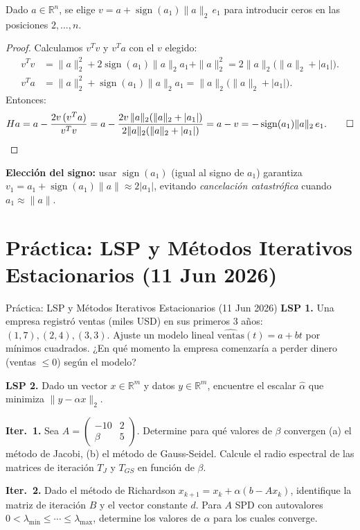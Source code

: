 \documentclass[11pt,a4paper]{article}
\begin{document}
Dado $a \in \mathbb{R}^n$, se elige
$v = a + \operatorname{sign}(a_1)\|a\|_2\,e_1$
para introducir ceros en las posiciones $2,\ldots,n$.

\begin{proof}
Calculamos $v^Tv$ y $v^Ta$ con el $v$ elegido:
\begin{align*}
  v^Tv &= \|a\|_2^2 + 2\operatorname{sign}(a_1)\|a\|_2 a_1 + \|a\|_2^2
         = 2\|a\|_2\bigl(\|a\|_2 + |a_1|\bigr).\\
  v^Ta &= \|a\|_2^2 + \operatorname{sign}(a_1)\|a\|_2 a_1
         = \|a\|_2\bigl(\|a\|_2 + |a_1|\bigr).
\end{align*}
Entonces:
\[
  Ha = a - \frac{2v\,(v^Ta)}{v^Tv}
  = a - \frac{2v\,\|a\|_2(\|a\|_2+|a_1|)}{2\|a\|_2(\|a\|_2+|a_1|)}
  = a - v = -\operatorname{sign}(a_1)\|a\|_2\,e_1. \qed
\]
\end{proof}

\begin{tcolorbox}[clave]
\textbf{Elección del signo:} usar $\operatorname{sign}(a_1)$ (igual al signo de $a_1$)
garantiza $v_1 = a_1 + \operatorname{sign}(a_1)\|a\|\approx 2|a_1|$,
evitando \textit{cancelación catastrófica} cuando $a_1 \approx \|a\|$.
\end{tcolorbox}

\section{Práctica: LSP y Métodos Iterativos Estacionarios (11 Jun 2026)}
\label{sec:practica_lsp_jacobi}

\begin{examen}{Práctica: LSP y Métodos Iterativos Estacionarios (11 Jun 2026)}
\textbf{LSP 1.} Una empresa registró ventas (miles USD) en sus primeros 3 años: $(1,7),(2,4),(3,3)$. Ajuste un modelo lineal $\widehat{\text{ventas}}(t)=a+bt$ por mínimos cuadrados. ¿En qué momento la empresa comenzaría a perder dinero (ventas $\le0$) según el modelo?

\smallskip\textbf{LSP 2.} Dado un vector $x\in\mathbb{R}^m$ y datos $y\in\mathbb{R}^m$, encuentre el escalar $\hat\alpha$ que minimiza $\|y-\alpha x\|_2$.

\smallskip\textbf{Iter.\ 1.} Sea $A=\begin{pmatrix}-10&2\\\beta&5\end{pmatrix}$. Determine para qué valores de $\beta$ convergen (a) el método de Jacobi, (b) el método de Gauss-Seidel. Calcule el radio espectral de las matrices de iteración $T_J$ y $T_{GS}$ en función de $\beta$.

\smallskip\textbf{Iter.\ 2.} Dado el método de Richardson $x_{k+1}=x_k+\alpha(b-Ax_k)$, identifique la matriz de iteración $B$ y el vector constante $d$. Para $A$ SPD con autovalores $0<\lambda_{\min}\le\cdots\le\lambda_{\max}$, determine los valores de $\alpha$ para los cuales converge.
\end{examen}
\end{document}
